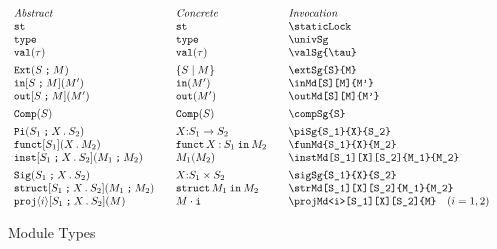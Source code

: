 \documentclass[11pt]{article}
\begin{document}
\begin{figure}

  \begin{small}
    \begin{displaymath}
      \begin{array}{l@{\qquad}l@{\qquad}l@{\qquad}l}
        \textit{Abstract} & \textit{Concrete} & \textit{Invocation} \\
        \staticLock                    & \staticLock*         & \verb|\staticLock|                              \\
        \univSg                        & \univSg*             & \verb|\univSg|                                  \\
        \valSg{\tau}                   & \valSg*{\tau}        & \verb|\valSg{\tau}|                             \\[1ex]
        \extSg{S}{M}                   & \extSg*{S}{M}        & \verb|\extSg{S}{M}|                             \\
        \inMd[S][M]{M'}                & \inMd*{M'}           & \verb|\inMd[S][M]{M'}|                          \\
        \outMd[S][M]{M'}               & \outMd*{M'}          & \verb|\outMd[S][M]{M'}|                         \\[1ex]
        \compSg{S}                     & \compSg*{S}          & \verb|\compSg{S}|                               \\[1ex]
        \piSg{S_1}{X}{S_2}             & \piSg*{S_1}{X}{S_2}  & \verb|\piSg{S_1}{X}{S_2}|                       \\
        \funMd{S_1}{X}{M_2}            & \funMd*{S_1}{X}{M_2} & \verb|\funMd{S_1}{X}{M_2}|                      \\
        \instMd[S_1][X][S_2]{M_1}{M_2} & \instMd*{M_1}{M_2}   & \verb|\instMd[S_1][X][S_2]{M_1}{M_2}|           \\[1ex]
        \sigSg{S_1}{X}{S_2}            & \sigSg*{S_1}{X}{S_2} & \verb|\sigSg{S_1}{X}{S_2}|                      \\
        \strMd[S_1][X][S_2]{M_1}{M_2}  & \strMd*{M_1}{M_2}    & \verb|\strMd[S_1][X][S_2]{M_1}{M_2}|            \\
        \projMd<i>[S_1][X][S_2]{M}     & \projMd*<i>{M}       & \verb|\projMd<i>[S_1][X][S_2]{M}| \quad (i=1,2)
      \end{array}
    \end{displaymath}
  \end{small}

  \caption{Module Types}
  \label{fig:mod}
\end{figure}
\end{document}
